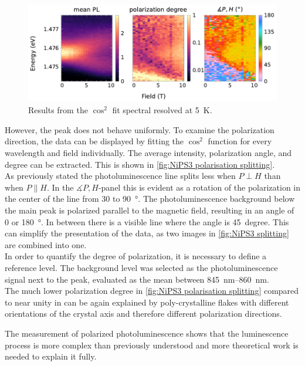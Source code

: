 \documentclass[
	oneside,
	parskip=half,
	a4paper,
]{scrbook}
\begin{document}
\begin{figure}
	\centering
	\includegraphics{../figures/2024-04-09 NiPS3 polarisation Splitting.pdf}
	\caption{Results from the $\cos^2$ fit spectral resolved at \SI{5}{K}.}
	\label{fig:NiPS3 polarisation splitting}
\end{figure}
However, the peak does not behave uniformly.
To examine the polarization direction, the data can be displayed by fitting the $\cos^2$ function for every wavelength and field individually.
The average intensity, polarization angle, and degree can be extracted.
This is shown in \autoref{fig:NiPS3 polarisation splitting}.\\
As previously stated the photoluminescence line splits less when $P\perp H$ than when $P\parallel H$.
In the $\measuredangle P, H$-panel this is evident as a rotation of the polarization in the center of the line from $30$ to \SI{90}{\degree}.
The photoluminescence background below the main peak is polarized parallel to the magnetic field, resulting in an angle of $0$ or \SI{180}{\degree}.
In between there is a visible line where the angle is \SI{45}{degree}.
This can simplify the presentation of the data, as two images in \autoref{fig:NiPS3 splitting} are combined into one.\\
In order to quantify the degree of polarization, it is necessary to define a reference level.
The background level was selected as the photoluminescence signal next to the peak, evaluated as the mean between \SIrange{845}{860}{nm}.\\
The much lower polarization degree in \autoref{fig:NiPS3 polarisation splitting} compared to near unity in \cite{NiPS3_anisotropic} can be again explained by poly-crystalline flakes with different orientations of the crystal axis and therefore different polarization directions.

The measurement of polarized photoluminescence shows that the luminescence process is more complex than previously understood and more theoretical work is needed to explain it fully.
\end{document}
